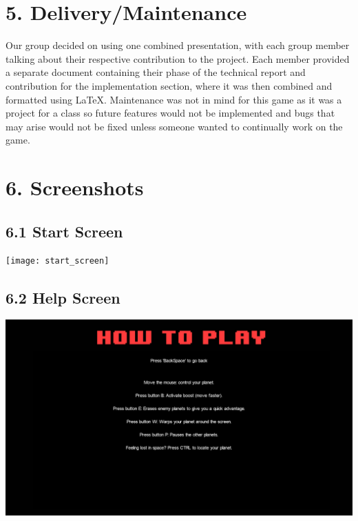\documentclass[12pt]{report}
\begin{document}
\newpage
\section*{5. Delivery/Maintenance}
Our group decided on using one combined presentation, with each group member talking about their respective contribution to the project. Each member provided a separate document containing their phase of the technical report and contribution for the implementation section, where it was then combined and formatted using LaTeX. Maintenance was not in mind for this game as it was a project for a class so future features would not be implemented and bugs that may arise would not be fixed unless someone wanted to continually work on the game.

\newpage
\section*{6. Screenshots}

\subsection*{6.1 Start Screen}
\texttt{[image: start\_screen]}

\subsection*{6.2 Help Screen}
\includegraphics[width=\textwidth]{help_screen}
\end{document}
